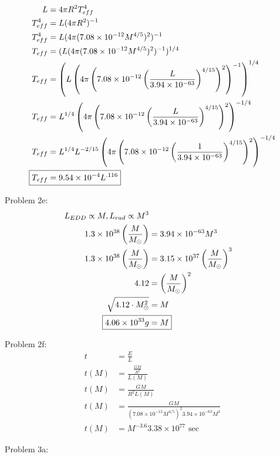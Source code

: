 \documentclass[10pt,letter,preprint]{aastex}
\newcommand{\pt}{\propto}
\newcommand{\rp}{\right)}
\newcommand{\lp}{\left(}
\newcommand{\mfrac}{\lp \frac{M}{M_\odot}\rp}
\newcommand{\ms}{M_\odot}
\begin{document}
\newpage
\begin{align}
L &= 4 \pi R^2 T_{eff}^4\\
T_{eff}^4 &= L (4 \pi R^2)^{-1}\\
T_{eff}^4 &= L (4 \pi (7.08 \times 10^{-12}M^{4/5})^2)^{-1}\\
T_{eff} &= (L (4 \pi (7.08 \times 10^{-12}M^{4/5})^2)^{-1} )^{1/4}\\
T_{eff} &= \lp L \lp 4 \pi \lp 7.08 \times 10^{-12} \lp \frac{L}{3.94 \times 10^{-63}} \rp^{4/15} \rp^2\rp^{-1} \rp^{1/4}\\
T_{eff} &= L^{1/4}  \lp 4 \pi \lp 7.08 \times 10^{-12} \lp \frac{L}{3.94 \times 10^{-63}} \rp^{4/15} \rp^2\rp^{-1/4}\\
T_{eff} &= L^{1/4}L^{-2/15}   \lp 4 \pi \lp 7.08 \times 10^{-12} \lp \frac{1}{3.94 \times 10^{-63}} \rp^{4/15} \rp^2\rp^{-1/4}\\
\Aboxed{T_{eff} &= 9.54 \times 10^{-4} L^{.116}}
\end{align}

Problem 2e:\\
\begin{align}
L_{EDD} \pt M, L_{rad} \pt M^3\\
1.3 \times 10^{38} \mfrac &= 3.94 \times 10^{-63} M^3\\
1.3 \times 10^{38} \mfrac &= 3.15 \times 10^{37} \mfrac^3\\
4.12 &= \mfrac^2\\
\sqrt{4.12 \cdot \ms^2 } &= M\\
\Aboxed{4.06 \times 10^{33} g &= M}
\end{align}

Problem 2f:\\
\begin{align}
t &= \frac{E}{L}\\
t(M) &= \frac{\frac{GM}{R^2}}{L(M)}\\
t(M) &= \frac{GM}{R^2L(M)}\\
t(M) &= \frac{GM}{(7.08 \times 10^{-12} M^{4/5})^2 3.94 \times 10^{-63}M^3}\\
t(M) &= M^{-3.6} 3.38\times 10^{77}\textrm{ sec}
\end{align}

Problem 3a:\\
%
\end{document}
